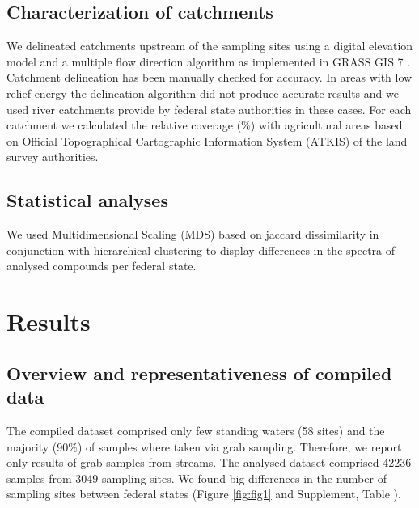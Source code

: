 \documentclass[journal=esthag,manuscript=article]{achemso}
\begin{document}
\subsection{Characterization of catchments}
We delineated catchments upstream of the sampling sites using a digital elevation model \citep{eea_digital_2013} and a multiple flow direction algorithm \citep{holmgren_multiple_1994} as implemented in GRASS GIS 7 \citep{neteler_grass_2012}.
Catchment delineation has been manually checked for accuracy. 
In areas with low relief energy the delineation algorithm did not produce accurate results and we used river catchments provide by federal state authorities in these cases.
For each catchment we calculated the relative coverage (\%) with agricultural areas based on Official Topographical Cartographic Information System (ATKIS) of the land survey authorities.


\subsection{Statistical analyses}

We used Multidimensional Scaling (MDS) based on jaccard dissimilarity in conjunction with hierarchical clustering to display differences in the spectra of analysed compounds per federal state.




\section{Results}
\subsection{Overview and representativeness of compiled data}

The compiled dataset comprised only few standing waters (58 sites) and the majority (90\%) of samples where taken via grab sampling.  %
Therefore, we report only results of grab samples from streams. 
The analysed dataset comprised 42236 samples from 3049 sampling sites.  %
We found big differences in the number of sampling sites between federal states (Figure \ref{fig:fig1} and Supplement, Table ).
\end{document}
